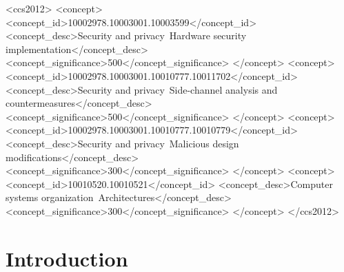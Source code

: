 \documentclass[sigconf, screen, review]{acmart}
\begin{document}
\begin{CCSXML}
<ccs2012>
   <concept>
       <concept_id>10002978.10003001.10003599</concept_id>
       <concept_desc>Security and privacy~Hardware security implementation</concept_desc>
       <concept_significance>500</concept_significance>
       </concept>
   <concept>
       <concept_id>10002978.10003001.10010777.10011702</concept_id>
       <concept_desc>Security and privacy~Side-channel analysis and countermeasures</concept_desc>
       <concept_significance>500</concept_significance>
       </concept>
   <concept>
       <concept_id>10002978.10003001.10010777.10010779</concept_id>
       <concept_desc>Security and privacy~Malicious design modifications</concept_desc>
       <concept_significance>300</concept_significance>
       </concept>
   <concept>
       <concept_id>10010520.10010521</concept_id>
       <concept_desc>Computer systems organization~Architectures</concept_desc>
       <concept_significance>300</concept_significance>
       </concept>
 </ccs2012>
\end{CCSXML}



\maketitle

\section{Introduction}

\end{document}
